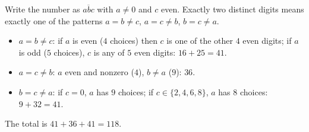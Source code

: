 Write the number as $\overline{abc}$ with $a\ne0$ and $c$ even. Exactly two distinct digits means exactly one of the patterns $a=b\ne c$, $a=c\ne b$, $b=c\ne a$.
\begin{itemize}
\item $a=b\ne c$: if $a$ is even ($4$ choices) then $c$ is one of the other $4$ even digits; if $a$ is odd ($5$ choices), $c$ is any of $5$ even digits: $16+25=41$.
\item $a=c\ne b$: $a$ even and nonzero ($4$), $b\ne a$ ($9$): $36$.
\item $b=c\ne a$: if $c=0$, $a$ has $9$ choices; if $c\in\{2,4,6,8\}$, $a$ has $8$ choices: $9+32=41$.
\end{itemize}
The total is $41+36+41=\boxed{118}$.
